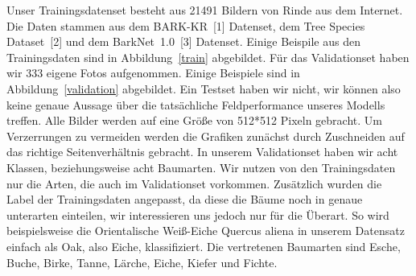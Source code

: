 \documentclass{article}
\begin{document}
Unser Trainingsdatenset besteht aus 21491 Bildern von Rinde aus dem Internet. Die Daten stammen aus dem BARK-KR~[1] Datenset, dem Tree Species Dataset~[2] und dem BarkNet~1.0~[3] Datenset. Einige Beispile aus den Trainingsdaten sind in Abbildung~\ref{train} abgebildet. Für das Validationset haben wir 333 eigene Fotos aufgenommen. Einige Beispiele sind in Abbildung~\ref{validation} abgebildet. Ein Testset haben wir nicht, wir können also keine genaue Aussage über die tatsächliche Feldperformance unseres Modells treffen. Alle Bilder werden auf eine Grö\ss e von 512*512 Pixeln gebracht. Um Verzerrungen zu vermeiden werden die Grafiken zunächst durch Zuschneiden auf das richtige Seitenverhältnis gebracht. In unserem Validationset haben wir acht Klassen, beziehungsweise acht Baumarten. Wir nutzen von den Trainingsdaten nur die Arten, die auch im Validationset vorkommen. Zusätzlich wurden die Label der Trainingsdaten angepasst, da diese die Bäume noch in genaue unterarten einteilen, wir interessieren uns jedoch nur für die Überart. So wird beispielsweise die Orientalische Wei\ss -Eiche Quercus aliena in unserem Datensatz einfach als Oak, also Eiche, klassifiziert. Die vertretenen Baumarten sind Esche, Buche, Birke, Tanne, Lärche, Eiche, Kiefer und Fichte.
\end{document}
